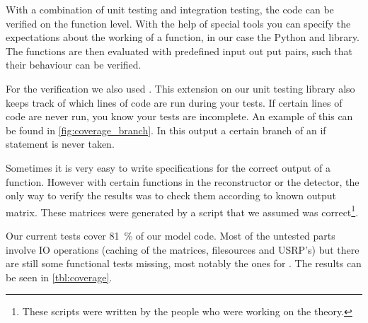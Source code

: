 \documentclass[a4paper, openany, oneside]{memoir}
\begin{document}
With a combination of unit testing and integration testing, the code can be verified on the function level. With the help of special tools you can specify the expectations about the working of a function, in our case the Python  and  library. The functions are then evaluated with predefined input out put pairs, such that their behaviour can be verified.

For the verification we also used . This extension on our unit testing library also keeps track of which lines of code are run during your tests. If certain lines of code are never run, you know your tests are incomplete. An example of this can be found in \cref{fig:coverage_branch}. In this output a certain branch of an if statement is never taken.

Sometimes it is very easy to write specifications for the correct output of a function. However with certain functions in the reconstructor or the detector, the only way to verify the results was to check them according to known output matrix. These matrices were generated by a \matlab{} script that we assumed was correct\footnote{These \matlab{} scripts were written by the people who were working on the theory.}. 

Our current tests cover \SI{81}{\percent} of our model code. Most of the untested parts involve IO operations (caching of the matrices, filesources and USRP's) but there are still some functional tests missing, most notably the ones for . The results can be seen in \cref{tbl:coverage}.
\end{document}
